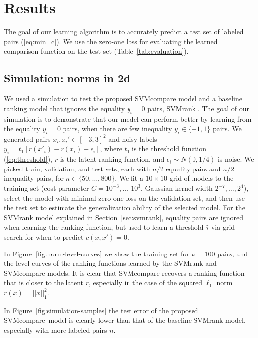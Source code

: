 \documentclass{article}
\newcommand{\SVMcompare}{SVMcompare}
\begin{document}
\section{Results}
\label{sec:results}

The goal of our learning algorithm is to accurately predict a test set
of labeled pairs (\ref{eq:min_c}). We use the zero-one loss for
evaluating the learned comparison function on the test set
(Table~\ref{tab:evaluation}).

\subsection{Simulation: norms in 2d}

We used a simulation to test the proposed SVMcompare model and a
baseline ranking model that ignores the equality $y_i=0$ pairs,
SVMrank \citep{ranksvm}. The goal of our simulation is to demonstrate
that our model can perform better by learning from the equality
$y_i=0$ pairs, when there are few inequality $y_i\in\{-1,1\}$
pairs. We generated pairs $x_i,x_i'\in[-3,3]^2$ and noisy labels
$y_i=t_1[r(x'_i)-r(x_i)+\epsilon_i]$, where $t_1$ is the threshold
function (\ref{eq:threshold}), $r$ is the latent ranking function, and
$\epsilon_i\sim N(0, 1/4)$ is noise. We picked train, validation, and
test sets, each with $n/2$ equality pairs and $n/2$ inequality pairs,
for $n\in\{50,\dots,800\}$. We fit a $10\times 10$ grid of models to
the training set (cost parameter $C=10^{-3},\dots,10^3$, Gaussian
kernel width $2^{-7},\dots,2^4$), select the model with minimal
zero-one loss on the validation set, and then use the test set to
estimate the generalization ability of the selected model. For the
SVMrank model explained in Section~\ref{sec:svmrank}, equality pairs
are ignored when learning the ranking function, but used to learn a
threshold $\hat \tau$ via grid search for when to predict $c(x,x')=0$.

In Figure~\ref{fig:norm-level-curves} we show the training set for
$n=100$ pairs, and the level curves of the ranking functions learned
by the SVMrank and SVMcompare models. It is clear that SVMcompare
recovers a ranking function that is closer to the latent $r$,
especially in the case of the squared $\ell_1$ norm $r(x)=||x||_1^2$.

In Figure~\ref{fig:simulation-samples} the test error of the proposed
\SVMcompare\ model is clearly lower than that of the baseline SVMrank
model, especially with more labeled pairs $n$. 

\end{document}
